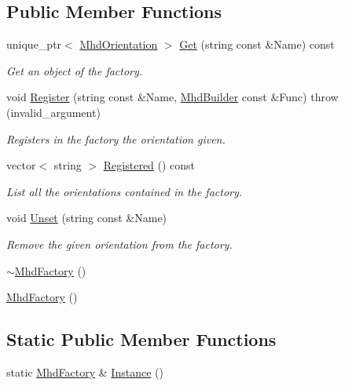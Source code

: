 \subsection*{\-Public \-Member \-Functions}
\begin{DoxyCompactItemize}
\item 
unique\-\_\-ptr$<$ \hyperlink{classMhd_1_1MhdOrientation}{\-Mhd\-Orientation} $>$ \hyperlink{classMhd_1_1MhdFactory_a41095d4c88c3cd2a3bf8c24081b485b8}{\-Get} (string const \&\-Name) const 
\begin{DoxyCompactList}\small\item\em \-Get an object of the factory. \end{DoxyCompactList}\item 
void \hyperlink{classMhd_1_1MhdFactory_ae24c471f86ce728f63b9d639a5c57284}{\-Register} (string const \&\-Name, \hyperlink{namespaceMhd_a9b520e48eb7e726a85e6224875935aff}{\-Mhd\-Builder} const \&\-Func)  throw (invalid\-\_\-argument)
\begin{DoxyCompactList}\small\item\em \-Registers in the factory the orientation given. \end{DoxyCompactList}\item 
vector$<$ string $>$ \hyperlink{classMhd_1_1MhdFactory_a2e0a9c9984f7fea4251656bb3e401100}{\-Registered} () const 
\begin{DoxyCompactList}\small\item\em \-List all the orientations contained in the factory. \end{DoxyCompactList}\item 
void \hyperlink{classMhd_1_1MhdFactory_ab0a2f768224b9a72680b62540fde82c2}{\-Unset} (string const \&\-Name)
\begin{DoxyCompactList}\small\item\em \-Remove the given orientation from the factory. \end{DoxyCompactList}\item 
\hyperlink{classMhd_1_1MhdFactory_a80a3c72319b23cf062311e477720b04a}{$\sim$\-Mhd\-Factory} ()
\item 
\hyperlink{classMhd_1_1MhdFactory_a5a744415bb4094fa157cb6b913c72c2d}{\-Mhd\-Factory} ()
\end{DoxyCompactItemize}
\subsection*{\-Static \-Public \-Member \-Functions}
\begin{DoxyCompactItemize}
\item 
static \hyperlink{classMhd_1_1MhdFactory}{\-Mhd\-Factory} \& \hyperlink{classMhd_1_1MhdFactory_a94346aec0e8f822e3f7934389f3ab28c}{\-Instance} ()
\end{DoxyCompactItemize}


